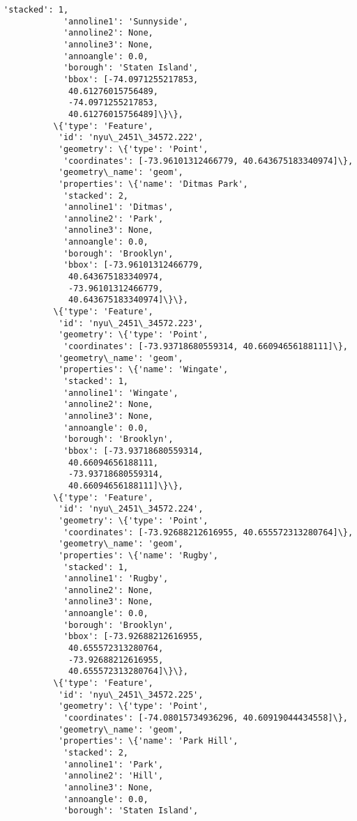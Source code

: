 \documentclass[11pt]{article}
\begin{document}
\begin{Verbatim}[commandchars=\\\{\}]
            'stacked': 1,
            'annoline1': 'Sunnyside',
            'annoline2': None,
            'annoline3': None,
            'annoangle': 0.0,
            'borough': 'Staten Island',
            'bbox': [-74.0971255217853,
             40.61276015756489,
             -74.0971255217853,
             40.61276015756489]\}\},
          \{'type': 'Feature',
           'id': 'nyu\_2451\_34572.222',
           'geometry': \{'type': 'Point',
            'coordinates': [-73.96101312466779, 40.643675183340974]\},
           'geometry\_name': 'geom',
           'properties': \{'name': 'Ditmas Park',
            'stacked': 2,
            'annoline1': 'Ditmas',
            'annoline2': 'Park',
            'annoline3': None,
            'annoangle': 0.0,
            'borough': 'Brooklyn',
            'bbox': [-73.96101312466779,
             40.643675183340974,
             -73.96101312466779,
             40.643675183340974]\}\},
          \{'type': 'Feature',
           'id': 'nyu\_2451\_34572.223',
           'geometry': \{'type': 'Point',
            'coordinates': [-73.93718680559314, 40.66094656188111]\},
           'geometry\_name': 'geom',
           'properties': \{'name': 'Wingate',
            'stacked': 1,
            'annoline1': 'Wingate',
            'annoline2': None,
            'annoline3': None,
            'annoangle': 0.0,
            'borough': 'Brooklyn',
            'bbox': [-73.93718680559314,
             40.66094656188111,
             -73.93718680559314,
             40.66094656188111]\}\},
          \{'type': 'Feature',
           'id': 'nyu\_2451\_34572.224',
           'geometry': \{'type': 'Point',
            'coordinates': [-73.92688212616955, 40.655572313280764]\},
           'geometry\_name': 'geom',
           'properties': \{'name': 'Rugby',
            'stacked': 1,
            'annoline1': 'Rugby',
            'annoline2': None,
            'annoline3': None,
            'annoangle': 0.0,
            'borough': 'Brooklyn',
            'bbox': [-73.92688212616955,
             40.655572313280764,
             -73.92688212616955,
             40.655572313280764]\}\},
          \{'type': 'Feature',
           'id': 'nyu\_2451\_34572.225',
           'geometry': \{'type': 'Point',
            'coordinates': [-74.08015734936296, 40.60919044434558]\},
           'geometry\_name': 'geom',
           'properties': \{'name': 'Park Hill',
            'stacked': 2,
            'annoline1': 'Park',
            'annoline2': 'Hill',
            'annoline3': None,
            'annoangle': 0.0,
            'borough': 'Staten Island',

\end{Verbatim}
\end{document}

